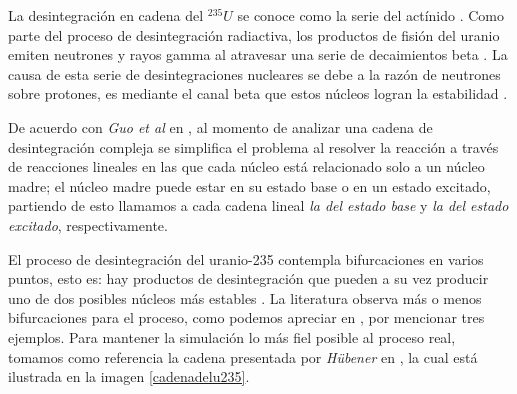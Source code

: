 La desintegración en cadena  del $^{235} U$ se conoce como la serie del actínido \cite{Podgorsak.2016}. Como parte del proceso de desintegración radiactiva, los productos de fisión del uranio emiten neutrones y rayos gamma al atravesar una serie de decaimientos beta \cite{Guo.2016}. La causa de esta serie de desintegraciones nucleares se debe a la razón de neutrones sobre protones, es mediante el canal beta que estos núcleos logran la estabilidad \cite{Guo.2016}. 

De acuerdo con \textit{Guo et al} en \cite{Guo.2016}, al momento de analizar una cadena de desintegración compleja se simplifica el problema al resolver la reacción a través de reacciones lineales en las que cada núcleo está relacionado solo a un núcleo madre; el núcleo madre puede estar en su estado base o en un estado excitado, partiendo de esto llamamos a cada cadena lineal \textit{la del estado base} y \textit{la del estado excitado}, respectivamente.

El proceso de desintegración del uranio-235 contempla bifurcaciones en varios puntos, esto es: hay productos de desintegración que pueden a su vez producir uno de dos posibles núcleos más estables \cite{HUBENER2003211, International_Atomic_Energy_Agency2013-bq}. La literatura observa más o menos bifurcaciones para el proceso, como podemos apreciar en \cite{HUBENER2003211,International_Atomic_Energy_Agency2013-bq,Pratiwi.2021,Loch.2013}, por mencionar tres ejemplos. Para mantener la simulación lo más fiel posible al proceso real, tomamos como referencia la cadena presentada por \textit{Hübener} en \cite{HUBENER2003211}, la cual está ilustrada en la imagen \ref{cadenadelu235}.

